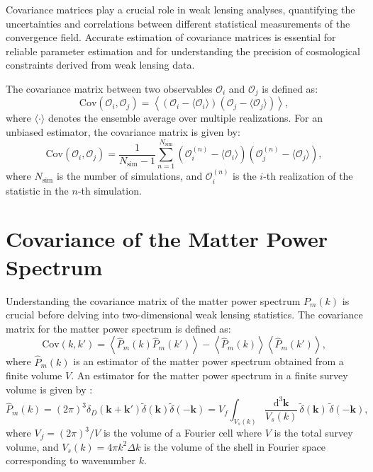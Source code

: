 Covariance matrices play a crucial role in weak lensing analyses, quantifying the uncertainties and correlations between different statistical measurements of the convergence field. Accurate estimation of covariance matrices is essential for reliable parameter estimation and for understanding the precision of cosmological constraints derived from weak lensing data.

The covariance matrix between two observables $\mathcal{O}_i$ and $\mathcal{O}_j$ is defined as:
\begin{equation}
    \mathrm{Cov}(\mathcal{O}_i, \mathcal{O}_j) = \left\langle (\mathcal{O}_i - \langle \mathcal{O}_i \rangle)(\mathcal{O}_j - \langle \mathcal{O}_j \rangle) \right\rangle,
\end{equation}
where $\langle \cdot \rangle$ denotes the ensemble average over multiple realizations.
For an unbiased estimator, the covariance matrix is given by:
\begin{equation}
    \label{eq:covariance}
    \mathrm{Cov}(\mathcal{O}_i, \mathcal{O}_j) = \frac{1}{N_{\mathrm{sim}} - 1} \sum_{n=1}^{N_{\mathrm{sim}}} (\mathcal{O}_i^{(n)} - \langle \mathcal{O}_i \rangle) (\mathcal{O}_j^{(n)} - \langle \mathcal{O}_j \rangle),
\end{equation}
where \( N_{\mathrm{sim}} \) is the number of simulations, and \( \mathcal{O}_i^{(n)} \) is the \( i \)-th realization of the statistic in the \( n \)-th simulation.

\section{Covariance of the Matter Power Spectrum}
Understanding the covariance matrix of the matter power spectrum \( P_m(k) \) is crucial before delving into two-dimensional weak lensing statistics. 
The covariance matrix for the matter power spectrum is defined as:
\begin{equation}
    \mathrm{Cov}(k, k') = \left\langle \hat{P}_m(k) \hat{P}_m(k') \right\rangle - \left\langle \hat{P}_m(k) \right\rangle \left\langle \hat{P}_m(k') \right\rangle,
\end{equation}
where \( \hat{P}_m(k) \) is an estimator of the matter power spectrum obtained from a finite volume \( V \).
An estimator for the matter power spectrum in a finite survey volume is given by \citep{1994ApJ...426...23F}:
\begin{equation}
    \hat{P}_m(k) = (2\pi)^3 \delta_D(\mathbf{k} + \mathbf{k'}) \tilde{\delta}(\mathbf{k}) \tilde{\delta}(-\mathbf{k}) = V_f \int_{V_s(k)} \frac{\mathrm{d}^3 \mathbf{k}}{V_s(k)} \, \tilde{\delta}(\mathbf{k}) \, \tilde{\delta}(-\mathbf{k}),
\end{equation}
where $V_f = (2\pi)^3 / V$ is the volume of a Fourier cell where $V$ is the total survey volume, and $V_s(k) = 4\pi k^2 \Delta k$ is the volume of the shell in Fourier space corresponding to wavenumber \( k \).

